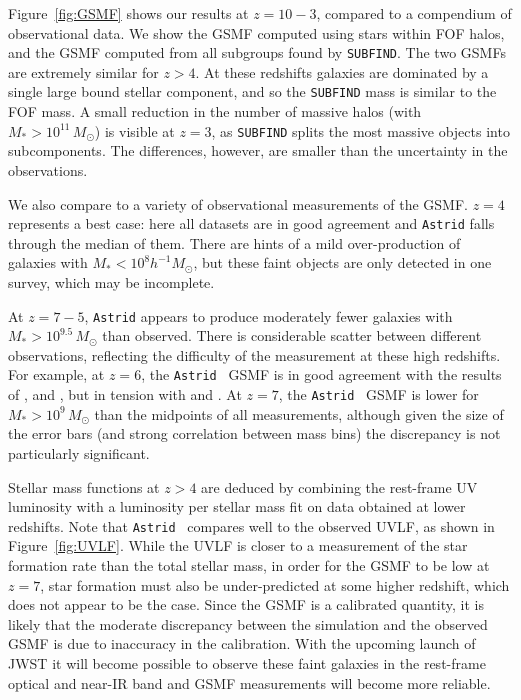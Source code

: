 \documentclass[fleqn,usenatbib]{mnras}
\def\astrid{\texttt{Astrid} }
\def\msun{\, M_{\odot}}
\begin{document}
Figure~\ref{fig:GSMF} shows our results at $z = 10 - 3$, compared to a compendium of observational data. We show the GSMF computed using stars within FOF halos, and the GSMF computed from all subgroups found by \texttt{SUBFIND}. The two GSMFs are extremely similar for $z > 4$. At these redshifts galaxies are dominated by a single large bound stellar component, and so the \texttt{SUBFIND} mass is similar to the FOF mass. A small reduction in the number of massive halos (with $M_* > 10^{11} \msun$) is visible at $z=3$, as \texttt{SUBFIND} splits the most massive objects into subcomponents. The differences, however, are smaller than the uncertainty in the observations.

We also compare to a variety of observational measurements of the GSMF. $z=4$ represents a best case: here all datasets are in good agreement and \astrid falls through the median of them. There are hints of a mild over-production of galaxies with $M_* < 10^8 h^{-1} M_\odot$, but these faint objects are only detected in one survey, which may be incomplete.

At $z = 7-5$, \astrid appears to produce moderately fewer galaxies with $M_* > 10^{9.5} \msun$ than observed. There is considerable scatter between different observations, reflecting the difficulty of the measurement at these high redshifts. For example, at $z=6$, the \astrid~GSMF is in good agreement with the results of \cite{Stefanon2017}, \cite{Gonzalez2011} and \cite{Song2016}, but in tension with \cite{Grazian2015} and \cite{Duncan2014}. At $z=7$, the \astrid~GSMF is lower for $M_* > 10^9 \msun$ than the midpoints of all measurements, although given the size of the error bars (and strong correlation between mass bins) the discrepancy is not particularly significant.

Stellar mass functions at $z > 4$ are deduced by combining the rest-frame UV luminosity with a luminosity per stellar mass fit on data obtained at lower redshifts. Note that \astrid~compares well to the observed UVLF, as shown in Figure~\ref{fig:UVLF}. While the UVLF is closer to a measurement of the star formation rate than the total stellar mass, in order for the GSMF to be low at $z=7$, star formation must also be under-predicted at some higher redshift, which does not appear to be the case. Since the GSMF is a calibrated quantity, it is likely that the moderate discrepancy between the simulation and the observed GSMF is due to inaccuracy in the calibration. With the upcoming launch of JWST it will become possible to observe these faint galaxies in the rest-frame optical and near-IR band and GSMF measurements will become more reliable.
\end{document}
